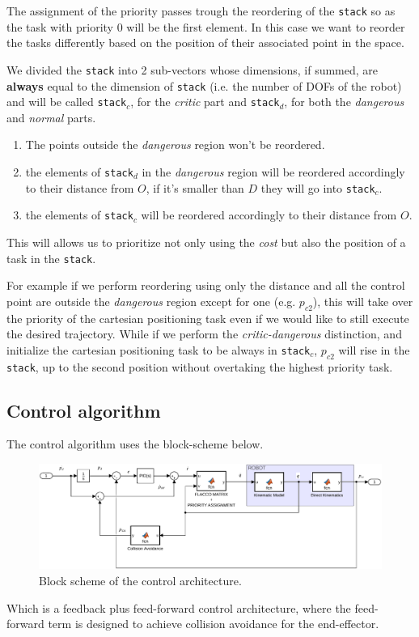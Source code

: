 \documentclass[12pt, a4paper]{article}
\begin{document}
The assignment of the priority passes trough the reordering of the \texttt{stack} so as the task with priority $0$ will be the first element.
In this case we want to reorder the tasks differently based on the position of their associated point in the space.

We divided the \texttt{stack} into 2 sub-vectors whose dimensions, if summed, are \textbf{always} equal to the dimension of \texttt{stack} (i.e. the number of DOFs of the robot) and will be called \texttt{stack$_c$}, for the \emph{critic} part and \texttt{stack$_d$}, for both the \emph{dangerous} and \emph{normal} parts.

\begin{enumerate}
\item The points outside the \emph{dangerous} region won't be reordered.
\item the elements of \texttt{stack$_d$} in the \emph{dangerous} region will be reordered accordingly to their distance from $O$, if it's smaller than $D$ they will go into \texttt{stack$_c$}.
\item the elements of \texttt{stack$_c$} will be reordered accordingly to their distance from $O$.
\end{enumerate}
This will allows us to prioritize not only using the \emph{cost} but also the position of a task in the \texttt{stack}.

For example if we perform reordering using only the distance and all the control point are outside the \emph{dangerous} region except for one (e.g. $p_{c2}$), this will take over the priority of the cartesian positioning task even if we would like to still execute the desired trajectory. While if we perform the \emph{critic-dangerous} distinction, and initialize the cartesian positioning task to be always in \texttt{stack$_c$}, $p_{c2}$ will rise in the \texttt{stack}, up to the second position without overtaking the highest priority task.
\subsection{Control algorithm}
The control algorithm uses the block-scheme below.
\begin{figure}[H]
\centering
\includegraphics[width = 1.2\linewidth]{./plots/ControlSchemeModel.pdf}
\caption{Block scheme of the control architecture.}
\end{figure}
Which is a feedback plus feed-forward control architecture, where the feed-forward term is designed to achieve collision avoidance for the end-effector.
\end{document}
